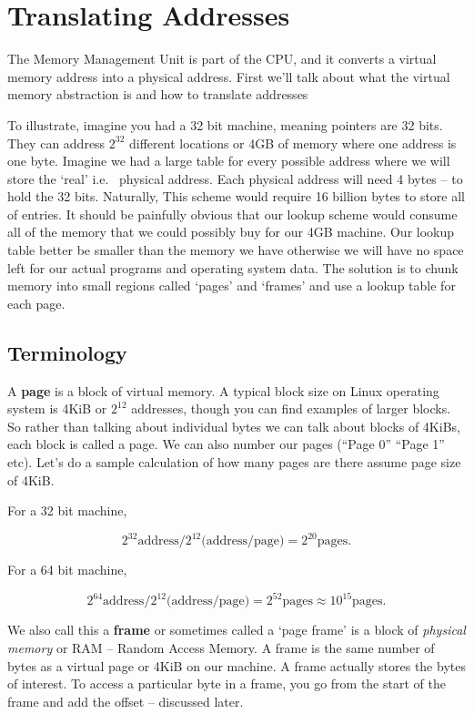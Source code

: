 \section{Translating Addresses}

The Memory Management Unit is part of the CPU, and it converts a virtual memory address into a physical address.
First we'll talk about what the virtual memory abstraction is and how to translate addresses

To illustrate, imagine you had a 32 bit machine, meaning pointers are 32 bits.
They can address $2^{32}$ different locations or 4GB of memory where one address is one byte.
Imagine we had a large table for every possible address where we will store the `real' i.e. ~physical address.
Each physical address will need 4 bytes -- to hold the 32 bits.
Naturally, This scheme would require 16 billion bytes to store all of entries.
It should be painfully obvious that our lookup scheme would consume all of the memory that we could possibly buy for our 4GB machine.
Our lookup table better be smaller than the memory we have otherwise we will have no space left for our actual programs and operating system data.
The solution is to chunk memory into small regions called `pages' and `frames' and use a lookup table for each page.

\subsection{Terminology}

A \textbf{page} is a block of virtual memory.
A typical block size on Linux operating system is 4KiB or $2^{12}$ addresses, though you can find examples of larger blocks.
So rather than talking about individual bytes we can talk about blocks of 4KiBs, each block is called a page.
We can also number our pages (``Page 0'' ``Page 1'' etc). Let's do a sample calculation of how many pages are there assume page size of 4KiB.

For a 32 bit machine,

\[
   2^{32} \text{address} / 2^{12} \text{(address/page)} = 2^{20} \text{pages}.
\]

For a 64 bit machine,

\[
   2^{64} \text{address} / 2^{12} \text{(address/page)} = 2^{52} \text{pages} \approx 10^{15} \text{pages}.
\]

We also call this a \textbf{frame} or sometimes called a `page frame' is a block of \emph{physical memory} or RAM -- Random Access Memory.
A frame is the same number of bytes as a virtual page or 4KiB on our machine.
A frame actually stores the bytes of interest.
To access a particular byte in a frame, you go from the start of the frame and add the offset -- discussed later.

